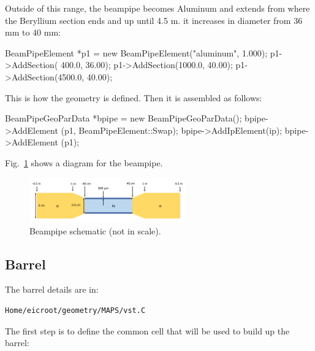 \documentclass[12pt]{article}
\begin{document}
Outside of this range, the beampipe becomes Aluminum and extends from where the Beryllium section ends and up until 4.5 m.
it increases in diameter from 36 mm to 40 mm:

\begin{tcolorbox}
\begin{verbnobox}[\scriptsize]
BeamPipeElement *p1 = new BeamPipeElement("aluminum", 1.000);
p1->AddSection( 400.0,  36.00);
p1->AddSection(1000.0,  40.00);
p1->AddSection(4500.0,  40.00);
\end{verbnobox}  
\end{tcolorbox}

This is how the geometry is defined. Then it is assembled as follows:

\begin{tcolorbox}
\begin{verbnobox}[\scriptsize]
BeamPipeGeoParData *bpipe = new BeamPipeGeoParData();
bpipe->AddElement  (p1, BeamPipeElement::Swap);
bpipe->AddIpElement(ip);
bpipe->AddElement  (p1);
\end{verbnobox}  
\end{tcolorbox}

Fig.~\ref{fig:beampipe} shows a diagram for the beampipe.

\begin{figure}[H]
\centering
\includegraphics[width=0.6\textwidth]{figures/beampipe.pdf}
\caption{Beampipe schematic (not in scale).}
\label{fig:beampipe}
\end{figure}

\subsection{Barrel}

The barrel details are in:

\begin{tcolorbox}
\begin{verbatim}
Home/eicroot/geometry/MAPS/vst.C
\end{verbatim}  
\end{tcolorbox}

The first step is to define the common cell that will be used to build up the barrel:
\end{document}
